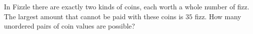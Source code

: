 In Fizzle there are exactly two kinds of coins, each worth a whole number of fizz. The largest amount that cannot be paid with these coins is $35$ fizz. How many unordered pairs of coin values are possible?
